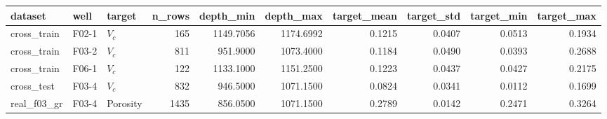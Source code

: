 \begin{tabular}{lllrrrrrrr}
\toprule
dataset & well & target & n\_rows & depth\_min & depth\_max & target\_mean & target\_std & target\_min & target\_max \\
\midrule
cross\_train & F02-1 & $V_c$ & 165 & 1149.7056 & 1174.6992 & 0.1215 & 0.0407 & 0.0513 & 0.1934 \\
cross\_train & F03-2 & $V_c$ & 811 & 951.9000 & 1073.4000 & 0.1184 & 0.0490 & 0.0393 & 0.2688 \\
cross\_train & F06-1 & $V_c$ & 122 & 1133.1000 & 1151.2500 & 0.1223 & 0.0437 & 0.0427 & 0.2175 \\
cross\_test & F03-4 & $V_c$ & 832 & 946.5000 & 1071.1500 & 0.0824 & 0.0341 & 0.0112 & 0.1699 \\
real\_f03\_gr & F03-4 & Porosity & 1435 & 856.0500 & 1071.1500 & 0.2789 & 0.0142 & 0.2471 & 0.3264 \\
\bottomrule
\end{tabular}
